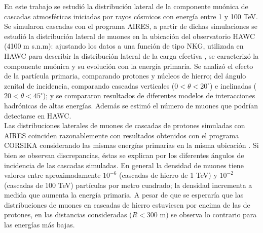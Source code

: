 \DIFdelbegin %

\DIFdelend \DIFaddbegin {}
\vspace{-5mm}

\DIFaddend En este trabajo se estudi\'o la distribuci\'on lateral de la componente mu\'onica de cascadas atmosf\'ericas iniciadas por rayos c\'osmicos con energ\'ia entre 1 y 100 TeV. Se simularon cascadas con el programa AIRES, a partir de dichas simulaciones se estudi\'o la distribuci\'on lateral de muones en la ubicaci\'on del observatorio HAWC (4100 m s.n.m): ajustando los datos a una funci\'on de tipo NKG, utilizada en HAWC para describir la distribuci\'on lateral de la carga efectiva \cite{Malone2018}, se caracteriz\'o la componente mu\'onica y su evoluci\'on con la energ\'ia primaria. Se analiz\'o el efecto de la part\'icula primaria, comparando protones y n\'ucleos de hierro; del \'angulo zenital de incidencia, comparando cascadas verticales ($0<\theta<20^{\circ}$) e inclinadas ($20<\theta<45^{\circ}$); y se compararon resultados de diferentes modelos de interacciones hadr\'onicas de altas energ\'ias. Adem\'as se estim\'o el n\'umero de muones que podr\'ian detectarse en HAWC.\\

Las distribuciones laterales de muones de cascadas de protones simuladas con AIRES coinciden razonablemente con resultados obtenidos con el programa CORSIKA considerando las mismas energ\'ias primarias en la misma ubicaci\'on \cite{Parsons2019}. Si bien se observan discrepancias, \'estas se explican por los diferentes \'angulos de incidencia de las cascadas simuladas. En general la densidad de muones tiene valores entre aproximadamente $10^{-6}$ (cascadas de hierro de 1 TeV) y $10^{-2}$ (cascadas de 100 TeV) part\'iculas por metro cuadrado; la densidad incrementa a medida que aumenta la energ\'ia primaria. A pesar de que \DIFdelbegin {}\DIFdelend \DIFaddbegin {}\DIFaddend se esperar\'ia que las distribuciones de muones en cascadas de hierro estuviesen por encima de las de protones, en las distancias consideradas ($R<300$ m) se observa lo contrario para las energ\'ias m\'as bajas. \\


